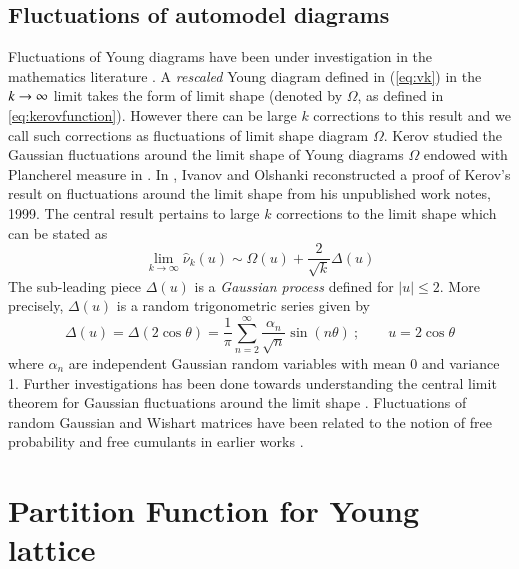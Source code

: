 \documentclass[final,3p,12pt,times]{elsarticle}
\numberwithin{equation}{section}
\begin{document}
\subsection{Fluctuations of automodel diagrams}

Fluctuations of Young diagrams have been under investigation in the mathematics literature \cite{Kerovfluctuation,johansson1998,2003math.4010I,2005math.1112S,2006math.7635B,BogachevSu,2014arXiv1402.4615D,2016arXiv160805163E,2017arXiv170402352D,2004math.5191M,2004math.5258M,2006math.6431C}. A \emph{rescaled} Young diagram defined in (\ref{eq:vk}) in the $k\rightarrow \infty$ limit takes the form of limit shape (denoted by $\Omega$, as defined in \eqref{eq:kerovfunction}). However there can be large $k$ corrections to this result and we call such corrections as fluctuations of limit shape diagram $\Omega$. Kerov studied the Gaussian fluctuations around the limit shape of Young diagrams $\Omega$ endowed with Plancherel measure in \cite{Kerovfluctuation}. In \cite{2003math.4010I}, Ivanov and Olshanki reconstructed a proof of Kerov's result on fluctuations around the limit shape from his unpublished work notes, 1999. The central result pertains to large $k$ corrections to the limit shape which can be stated as
%
\begin{equation}\label{eq:flucLS}
\lim_{k \to \infty} \hat{\nu}_k(u) \sim \Omega(u)+\frac{2}{\sqrt{k}}\Delta(u)
\end{equation}
%
The sub-leading piece $\Delta(u)$ is a \emph{Gaussian process} defined for $|u|\leq 2$. More precisely, $\Delta(u)$ is a random trigonometric series given by
%
\begin{equation}\label{eq:deltafluc}
\Delta(u)=\Delta(2\cos \theta)=\frac{1}{\pi}\sum_{n=2}^{\infty}\frac {\alpha_n}{\sqrt{n}}\sin(n\theta)\ ; \qquad u=2\cos \theta
\end{equation}
%
where $\alpha_n$ are independent Gaussian random variables with mean 0 and variance 1. Further investigations has been done towards understanding the central limit theorem for Gaussian fluctuations around the limit shape \cite{2006math.7635B,BogachevSu}. Fluctuations of random Gaussian and Wishart matrices have been related to the notion of free probability and free cumulants in earlier works \cite{2004math.5191M,2004math.5258M,2006math.6431C}.


\section{Partition Function for Young lattice}\label{sec:partitionfunction}
\end{document}
